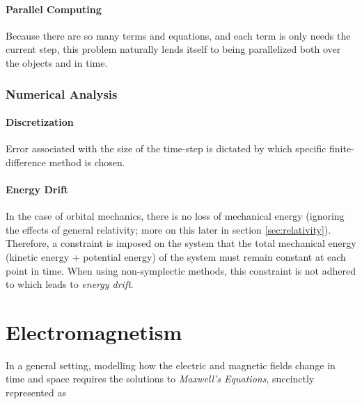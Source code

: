 \documentclass{report}
\begin{document}
            \subsubsection{Parallel Computing}

                Because there are so many terms and equations, and each term is only needs the current step, this problem naturally lends itself to being parallelized both over the objects\cite{parallelnbody} and in time\cite{LIONS2001661}.

        \subsection{Numerical Analysis}

            \subsubsection{Discretization}

                Error associated with the size of the time-step is dictated by which specific finite-difference method is chosen.

            \subsubsection{Energy Drift}

                In the case of orbital mechanics, there is no loss of mechanical energy (ignoring the effects of general relativity; more on this later in section \ref{sec:relativity}).  Therefore, a constraint is imposed on the system that the total mechanical energy (kinetic energy + potential energy) of the system must remain constant at each point in time.  When using non-symplectic methods, this constraint is not adhered to which leads to \emph{energy drift}.

\pagebreak
\chapter{Electromagnetism}

    In a general setting, modelling how the electric and magnetic fields change in time and space requires the solutions to \emph{Maxwell's Equations}\cite{griffiths2017introduction}, succinctly represented as
\end{document}
